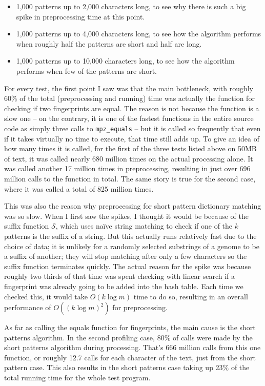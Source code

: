 \documentclass[ %
                    author={Dominic Joseph Moylett},
                    degree={MEng},
                     title={Dictionary Matching with Fingerprints},
                  subtitle={An Empirical Analysis},
                      type={research},
                      year={2015} ]{dissertation}
\begin{document}
\begin{itemize}
  \item 1,000 patterns up to 2,000 characters long, to see why there is such a big spike in preprocessing time at this point.
  \item 1,000 patterns up to 4,000 characters long, to see how the algorithm performs when roughly half the patterns are short and half are long.
  \item 1,000 patterns up to 10,000 characters long, to see how the algorithm performs when few of the patterns are short.
\end{itemize}

For every test, the first point I saw was that the main bottleneck, with roughly 60\% of the total (preprocessing and running) time was actually the function for checking if two fingerprints are equal. The reason is not because the function is a slow one -- on the contrary, it is one of the fastest functions in the entire source code as simply three calls to \texttt{mpz\_equals} -- but it is called so frequently that even if it takes virtually no time to execute, that time still adds up. To give an idea of how many times it is called, for the first of the three tests listed above on 50MB of text, it was called nearly 680 million times on the actual processing alone. It was called another 17 million times in preprocessing, resulting in just over 696 million calls to the function in total. The same story is true for the second case, where it was called a total of 825 million times.

This was also the reason why preprocessing for short pattern dictionary matching was so slow. When I first saw the spikes, I thought it would be because of the suffix function $\mathcal{S}$, which uses na\"{i}ve string matching to check if one of the $k$ patterns is the suffix of a string. But this actually runs relatively fast due to the choice of data; it is unlikely for a randomly selected substrings of a genome to be a suffix of another; they will stop matching after only a few characters so the suffix function terminates quickly. The actual reason for the spike was because roughly two thirds of that time was spent checking with linear search if a fingerprint was already going to be added into the hash table. Each time we checked this, it would take $O(k\log m)$ time to do so, resulting in an overall performance of $O((k\log m)^2)$ for preprocessing.

As far as calling the equals function for fingerprints, the main cause is the short patterns algorithm. In the second profiling case, 80\% of calls were made by the short patterns algorithm during processing. That's 666 million calls from this one function, or roughly 12.7 calls for each character of the text, just from the short pattern case. This also results in the short patterns case taking up 23\% of the total running time for the whole test program.
\end{document}
